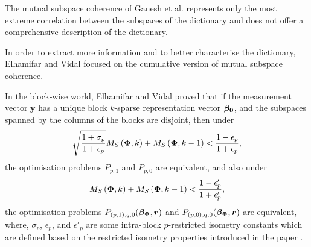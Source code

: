 The mutual subspace coherence of Ganesh et al. \cite{Ganesh2009} represents only the most extreme correlation between the subspaces of the dictionary and does not offer a comprehensive description of the dictionary. 

In order to extract more information and to better characterise the dictionary, Elhamifar and Vidal focused on the cumulative version of mutual subspace coherence.

In the block-wise world, Elhamifar and Vidal proved that if the measurement vector $\boldsymbol{y}$ has a unique block $k$-sparse representation vector $\boldsymbol{\beta_0}$, and the subspaces spanned by the columns of the blocks are disjoint, then under 
\begin{equation*}
\sqrt{\frac{1+\sigma_p}{1+\epsilon_p}}M_S\left( \boldsymbol{\Phi} , k \right) + M_S\left( \boldsymbol{\Phi} , k-1 \right) < \frac{1-\epsilon_p}{1+\epsilon_p},
\end{equation*}
the optimisation problems $P_{p,1}$ and $P_{p,0}$ are equivalent, and also under
\begin{equation*}
M_S\left( \boldsymbol{\Phi} , k \right) + M_S\left( \boldsymbol{\Phi} , k-1 \right) < \frac{1-\epsilon'_p}{1+\epsilon'_p},
\end{equation*}
the optimisation problems $P_{(p,1),q,0}(\boldsymbol{\beta}_{\boldsymbol{\Phi}},\boldsymbol{r})$ and $P_{(p,0),q,0}(\boldsymbol{\beta}_{\boldsymbol{\Phi}},\boldsymbol{r})$ are equivalent, where, $\sigma_p$, $\epsilon_p$, and $\epsilon'_p$ are some intra-block $p$-restricted isometry constants which are defined based on the restricted isometry properties introduced in the paper \cite{Elhamifar2012b}.